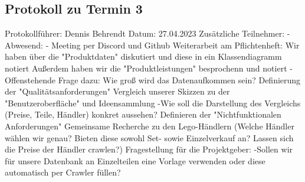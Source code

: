 \subsection{Protokoll zu Termin 3}
Protokollführer: Dennis Behrendt \newline
Datum: 27.04.2023 \newline
Zusätzliche Teilnehmer: - \newline
Abwesend: - \newline \newline
Meeting per Discord und Github \newline
Weiterarbeit am Pflichtenheft: \newline
Wir haben über die "Produktdaten" diskutiert und diese in ein Klassendiagramm notiert \newline
Außerdem haben wir die "Produktleistungen" besprochenn und notiert \newline
 -Offenstehende Frage dazu: Wie groß wird das Datenaufkommen sein? \newline
Definierung der "Qualitätsanforderungen" \newline
Vergleich unserer Skizzen zu der "Benutzeroberfläche" und Ideensammlung \newline
 -Wie soll die Darstellung des Vergleichs (Preise, Teile, Händler) konkret aussehen? \newline
Definieren der "Nichtfunktionalen Anforderungen" \newline
Gemeinsame Recherche zu den Lego-Händlern (Welche Händler wählen wir genau? Bieten diese sowohl Set- sowie Einzelverkauf an? Lassen sich die Preise der Händler crawlen?) \newline
Fragestellung für die Projektgeber: \newline
 -Sollen wir für unsere Datenbank an Einzelteilen eine Vorlage verwenden oder diese automatisch per Crawler füllen? \newline
 
